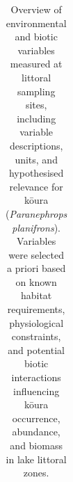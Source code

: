\documentclass[
  letterpaper,
  DIV=11,
  numbers=noendperiod]{scrartcl}
\begin{document}
\begin{landscape}
\begingroup\fontsize{7}{9}\selectfont

\begin{longtable}[t]{>{\raggedright\arraybackslash}p{2.5cm}>{\raggedright\arraybackslash}p{3.5cm}>{\raggedright\arraybackslash}p{9.5cm}>{\raggedright\arraybackslash}p{5.0cm}}

\caption{\label{tbl-environmental-biotic-overview}Overview of
environmental and biotic variables measured at littoral sampling sites,
including variable descriptions, units, and hypothesised relevance for
kōura (\emph{Paranephrops planifrons}). Variables were selected a priori
based on known habitat requirements, physiological constraints, and
potential biotic interactions influencing kōura occurrence, abundance,
and biomass in lake littoral zones.}

\tabularnewline


\end{longtable}
\end{landscape}
\end{document}
